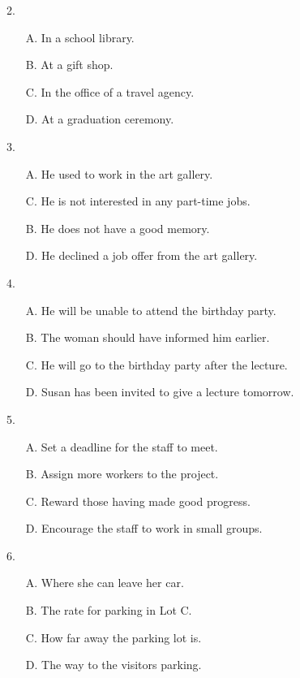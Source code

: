 \documentclass[UTF8,11pt]{ctexart}
\begin{document}
2.


\begin{itemize}[leftmargin=2em,itemsep=.2em,topsep=.4em]\item[A.] In a school library.
\item[B.] At a gift shop.
\item[C.] In the office of a travel agency.
\item[D.] At a graduation ceremony.
\end{itemize}

3.


\begin{itemize}[leftmargin=2em,itemsep=.2em,topsep=.4em]\item[A.] He used to work in the art gallery.
\item[C.] He is not interested in any part-time jobs.
\end{itemize}

\begin{itemize}[leftmargin=2em,itemsep=.2em,topsep=.4em]\item[B.] He does not have a good memory.
\item[D.] He declined a job offer from the art gallery.
\end{itemize}

4.


\begin{itemize}[leftmargin=2em,itemsep=.2em,topsep=.4em]\item[A.] He will be unable to attend the birthday party.
\item[B.] The woman should have informed him earlier.
\item[C.] He will go to the birthday party after the lecture.
\item[D.] Susan has been invited to give a lecture tomorrow.
\end{itemize}

5.


\begin{itemize}[leftmargin=2em,itemsep=.2em,topsep=.4em]\item[A.] Set a deadline for the staff to meet.
\item[B.] Assign more workers to the project.
\item[C.] Reward those having made good progress.
\item[D.] Encourage the staff to work in small groups.
\end{itemize}

6.


\begin{itemize}[leftmargin=2em,itemsep=.2em,topsep=.4em]\item[A.] Where she can leave her car.
\item[B.] The rate for parking in Lot C.
\item[C.] How far away the parking lot is.
\item[D.] The way to the visitors parking.
\end{itemize}
\end{document}
